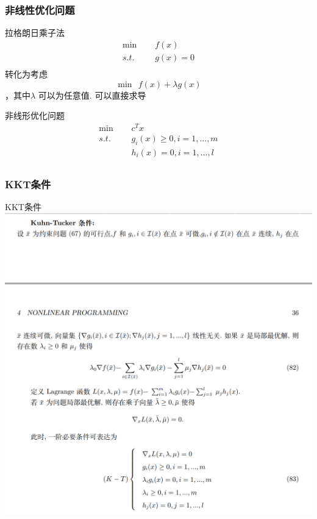 \documentclass{ctexbeamer}
\begin{document}
\subsubsection{非线性优化问题}


\begin{frame}{拉格朗日乘子法}
\begin{equation*}
    \begin{split}
        \min\ \ \ \ \ \ & f(x)\\
        s.t.\ \ \ \ \ \  & g(x) = 0\\
    \end{split}
\end{equation*}
转化为考虑 $$\min\ \ f(x)+\lambda g(x)$$，其中$\lambda$ 可以为任意值. 可以直接求导    
\end{frame}

\begin{frame}{非线形优化问题}
\begin{equation*}
    \begin{split}
        \min\ \ \ \ \ \ & c^Tx\\
        s.t.\ \ \ \ \ \  & g_i(x)\geq0, i=1,...,m\\
        & h_i(x)=0, i=1,...,l\\
    \end{split}
\end{equation*}
\end{frame}

\subsubsection{KKT条件}
\begin{frame}{KKT条件}
    \centering\includegraphics[scale=0.2]{QQ20220902-193038@2x.png}
\end{frame}
\end{document}
